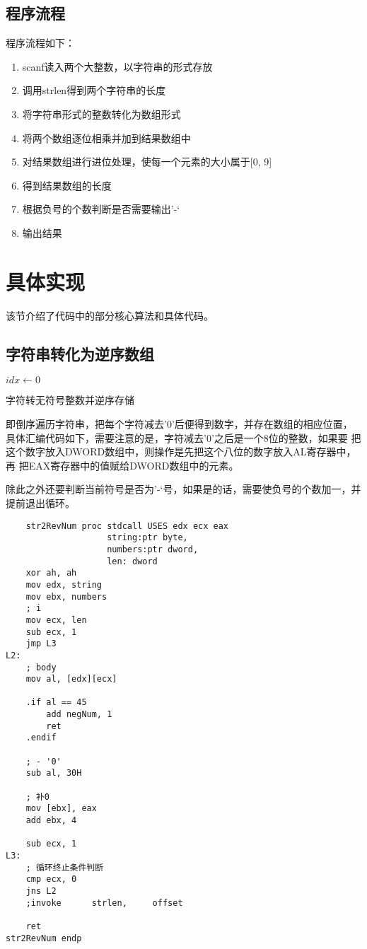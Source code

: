 \subsection{程序流程}
程序流程如下：
\begin{enumerate}
    \item scanf读入两个大整数，以字符串的形式存放
    \item 调用strlen得到两个字符串的长度
    \item 将字符串形式的整数转化为数组形式
    \item 将两个数组逐位相乘并加到结果数组中
    \item 对结果数组进行进位处理，使每一个元素的大小属于[0, 9]
    \item 得到结果数组的长度
    \item 根据负号的个数判断是否需要输出’-‘
    \item 输出结果
\end{enumerate}


\section{具体实现}
该节介绍了代码中的部分核心算法和具体代码。

\subsection{字符串转化为逆序数组}
\begin{algorithm}[H]
    \SetAlgoLined
    $idx \leftarrow 0$ \;

    \caption{字符转无符号整数并逆序存储}
\end{algorithm}

即倒序遍历字符串，把每个字符减去'0'后便得到数字，并存在数组的相应位置，
具体汇编代码如下，需要注意的是，字符减去'0'之后是一个8位的整数，如果要
把这个数字放入DWORD数组中，则操作是先把这个八位的数字放入AL寄存器中，再
把EAX寄存器中的值赋给DWORD数组中的元素。

除此之外还要判断当前符号是否为’-‘号，如果是的话，需要使负号的个数加一，并
提前退出循环。

\begin{lstlisting}
    str2RevNum proc stdcall USES edx ecx eax 
                    string:ptr byte, 
                    numbers:ptr dword, 
                    len: dword
    xor ah, ah
    mov edx, string
    mov ebx, numbers
    ; i
    mov ecx, len
    sub ecx, 1
    jmp L3
L2:
    ; body
    mov al, [edx][ecx]

    .if al == 45
        add negNum, 1
        ret
    .endif  

    ; - '0'
    sub al, 30H

    ; 补0
    mov [ebx], eax
    add ebx, 4

    sub ecx, 1
L3:
    ; 循环终止条件判断
    cmp ecx, 0
    jns L2
    ;invoke      strlen,     offset   

    ret
str2RevNum endp
\end{lstlisting}


